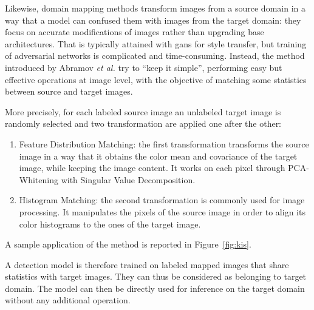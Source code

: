 \documentclass[%
    corpo=12pt,
    twoside,
    stile=classica,   
    tipotesi=magistrale,
    evenboxes,
    english,
	numerazioneromana,
]{toptesi}
\begin{document}
\bigskip
Likewise, domain mapping methods transform images from a source domain in a way that a model can confused them with images from the target domain: they focus on accurate modifications of images rather than upgrading base architectures. That is typically attained with \glspl{gan} for style transfer, but training of adversarial networks is complicated and time-consuming. Instead, the method introduced by Abramov \textit{et al.}\cite{abramov2020simple} try to \textquotedblleft keep it simple\textquotedblright, performing easy but effective operations at image level, with the objective of matching some statistics between source and target images.

More precisely, for each labeled source image an unlabeled target image is randomly selected and two transformation are applied one after the other:
\begin{enumerate}
	\item Feature Distribution Matching: the first transformation transforms the source image in a way that it obtains the color mean and covariance of the target image, while keeping the image content. It works on each pixel through PCA-Whitening with Singular Value Decomposition.
	\item Histogram Matching: the second transformation is commonly used for image processing. It manipulates the pixels of the source image in order to align its color histograms to the ones of the target image.
\end{enumerate}

A sample application of the method is reported in Figure~\ref{fig:kis}.

A detection model is therefore trained on labeled mapped images that share statistics with target images. They can thus be considered as belonging to target domain. The model can then be directly used for inference on the target domain without any additional operation.
\end{document}
